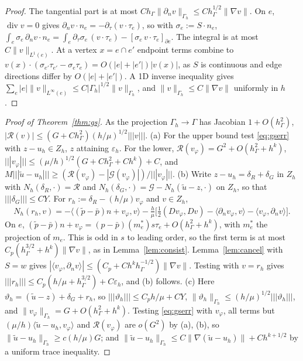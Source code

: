 \documentclass[5p,times]{elsarticle}
\theoremstyle{definition}
\newcommand{\hG}{h_\Gamma}
\newcommand{\Gh}{\Gamma_h}
\newcommand{\Zh}{Z_h}
\newcommand{\dn}{\partial_n}
\newcommand{\ut}{\tilde u}
\newcommand{\pt}{\tilde p}
\newcommand{\pbar}{\bar p}
\newcommand{\ip}[2]{\langle #1,#2\rangle}
\newcommand{\tnorm}[1]{|\!|\!|#1|\!|\!|}
\newcommand{\norm}[1]{\lVert #1\rVert}
\newcommand{\eps}{\varepsilon_h}
\newcommand{\Gc}{\mathcal G}
\newcommand{\Rc}{\mathcal R}
\renewcommand{\div}{\operatorname{div}}
\newcommand{\ext}[1]{\cite[#1]{PadhiExt}}
\begin{document}
\begin{proof}
The tangential part is at most $C\hG\norm{\dn v}_{\Gh}\le C\hG^{1/2}\norm{\nabla v}$. On $e$, $\div v=0$ gives $\dn v\cdot n_e=-\partial_\tau(v\cdot\tau_e)$, so with $\sigma_e:=S\cdot n_e$,
$\int_e\sigma_e\,\dn v\cdot n_e=\int_e\partial_\tau\sigma_e\,(v\cdot\tau_e)-[\sigma_e\,v\cdot\tau_e]_{\partial e}$.
The integral is at most $C\norm v_{L^1(e)}$. At a vertex $x=e\cap e'$ endpoint terms combine to $v(x)\cdot(\sigma_{e'}\tau_{e'}-\sigma_e\tau_e)=O(|e|+|e'|)|v(x)|$, as $S$ is continuous and edge directions differ by $O(|e|+|e'|)$. A 1D inverse inequality gives $\sum_e|e|\norm v_{L^\infty(e)}\le C|\Gh|^{1/2}\norm v_{\Gh}$, and $\norm v_{\Gh}\le C\norm{\nabla v}$ uniformly in $h$ \ext{Lemma~3.2}.
\end{proof}

\begin{proof}[Proof of Theorem~\ref{thm:gs}]
As the projection $\Gh\to\Gamma$ has Jacobian $1+O(\hG^2)$, $|\Rc(v)|\le(G+C\hG^2)(h/\mu)^{1/2}\tnorm v$. (a) For the upper bound test \eqref{eq:gserr} with $z-u_h\in\Zh$, $z$ attaining $\eps$. For the lower, $\Rc(v_\varphi)=G^2+O(\hG^2+h^k)$, $\tnorm{v_\varphi}\le(\mu/h)^{1/2}(G+C\hG^2+Ch^k)+C$, and $M\tnorm{\ut-u_h}\ge(\Rc(v_\varphi)-|\Gc(v_\varphi)|)/\tnorm{v_\varphi}$.
(b) Write $z-u_h=\delta_R+\delta_G$ in $\Zh$ with $N_h(\delta_R,\cdot)=\Rc$ and $N_h(\delta_G,\cdot)=\Gc-N_h(\ut-z,\cdot)$ on $\Zh$, so that $\tnorm{\delta_G}\le CY$. For $r_h:=\delta_R-(h/\mu)v_\varphi$ and $v\in\Zh$,
\[
N_h(r_h,v)=-\ip{(\pt-\pbar)n+v_\varphi}{v}-\tfrac h\mu\bigl[\tfrac12(Dv_\varphi,Dv)-\ip{\dn v_\varphi}{v}-\ip{v_\varphi}{\dn v}\bigr].
\]
On $e$, $(\pt-\pbar)n+v_\varphi=(p-\pbar)(m_e^\ast)s\tau_e+O(\hG^2+h^k)$, with $m_e^\ast$ the projection of $m_e$. This is odd in $s$ to leading order, so the first term is at most $C_p(\hG^{3/2}+h^k)\norm{\nabla v}$, as in Lemma~\ref{lem:consist}. Lemma~\ref{lem:cancel} with $S=w$ gives $|\ip{v_\varphi}{\dn v}|\le(C_p+Ch^k\hG^{-1/2})\norm{\nabla v}$. Testing with $v=r_h$ gives $\tnorm{r_h}\le C_p(h/\mu+\hG^{3/2})+C\eps$, and (b) follows.
(c) Here $\vartheta_h=(\ut-z)+\delta_G+r_h$, so $\tnorm{\vartheta_h}\le C_ph/\mu+CY$, $\norm{\vartheta_h}_{\Gh}\le(h/\mu)^{1/2}\tnorm{\vartheta_h}$, and $\norm{v_\varphi}_{\Gh}=G+O(\hG^2+h^k)$. Testing \eqref{eq:gserr} with $v_\varphi$, all terms but $(\mu/h)\ip{\ut-u_h}{v_\varphi}$ and $\Rc(v_\varphi)$ are $o(G^2)$ by (a), (b), so $\norm{\ut-u_h}_{\Gh}\ge c(h/\mu)G$; and $\norm{\ut-u_h}_{\Gh}\le C\norm{\nabla(\ut-u_h)}+Ch^{k+1/2}$ by a uniform trace inequality.
\end{proof}
\end{document}
